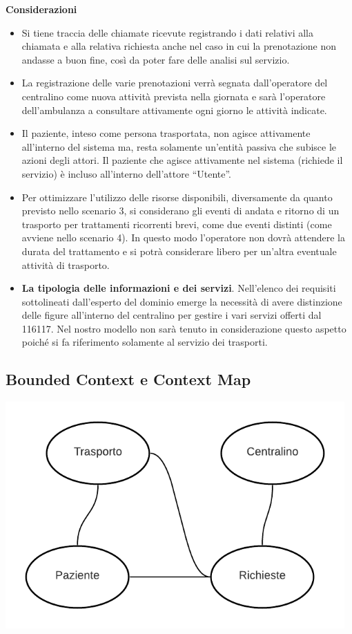 \documentclass[12pt]{article}
\begin{document}
\textbf{Considerazioni}
\begin{itemize}
    \item Si tiene traccia delle chiamate ricevute registrando i dati relativi alla chiamata e alla relativa richiesta anche nel caso in cui la prenotazione non andasse a buon fine, così da poter fare delle analisi sul servizio.
    \item La registrazione delle varie prenotazioni verrà segnata dall'operatore del centralino come nuova attività prevista nella giornata e sarà l’operatore dell'ambulanza a consultare attivamente ogni giorno le attività indicate.
    \item Il paziente, inteso come persona trasportata, non agisce attivamente all'interno del sistema ma, resta solamente un'entità passiva che subisce le azioni degli attori. Il paziente che agisce attivamente nel sistema (richiede il servizio) è incluso all'interno dell'attore “Utente”.
    \item Per ottimizzare l’utilizzo delle risorse disponibili, diversamente da quanto previsto nello scenario 3, si considerano gli eventi di andata e ritorno di un trasporto per trattamenti ricorrenti brevi, come due eventi distinti (come avviene nello scenario 4). In questo modo l’operatore non dovrà attendere la durata del trattamento e si potrà considerare libero per un'altra eventuale attività di trasporto. 
    \item \textbf{La tipologia delle informazioni e dei servizi}. Nell'elenco dei requisiti sottolineati dall'esperto del dominio emerge la necessità di avere distinzione delle figure all'interno del centralino per gestire i vari servizi offerti dal 116117. Nel nostro modello non sarà tenuto in considerazione questo aspetto poiché si fa riferimento solamente al servizio dei trasporti.
\end{itemize}

\subsection{Bounded Context e Context Map}

\centerline{\includegraphics[width=13cm]{fig/ContextMap.png}}
\end{document}
